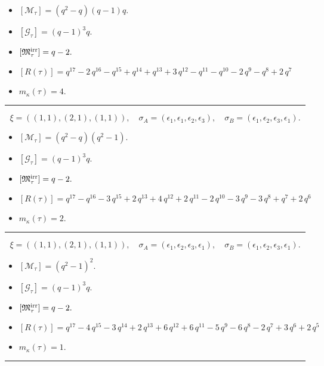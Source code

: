 \documentclass[10pt,a4paper]{amsart}
\begin{document}
\begin{itemize}
 \item $[\mathcal{M}_{\tau}] = {\left(q^{2} - q\right)} {\left(q - 1\right)} q .$

 \item $[\mathcal{G}_{\tau}] = {\left(q - 1\right)}^{3} q .$

 \item $[{\frak M}_{\tau}^{\textrm{irr}}] = q - 2 .$

 \item $[R(\tau)] = q^{17} - 2 \, q^{16} - q^{15} + q^{14} + q^{13} + 3 \, q^{12} - q^{11} - q^{10} - 2 \, q^{9} - q^{8} + 2 \, q^{7} $

 \item $m_{\kappa}(\tau) = 4 .$

 \end{itemize}
\noindent\rule{8cm}{0.4pt}

$$\xi = ({(1, 1)}, {(2, 1)}, {(1, 1)}),\quad \sigma_A = ({{\epsilon_1}}, {{\epsilon_1, \epsilon_2}}, {{\epsilon_3}}),\quad \sigma_B = ({{\epsilon_1}}, {{\epsilon_2, \epsilon_3}}, {{\epsilon_1}}).$$

\begin{itemize}
 \item $[\mathcal{M}_{\tau}] = {\left(q^{2} - q\right)} {\left(q^{2} - 1\right)} .$

 \item $[\mathcal{G}_{\tau}] = {\left(q - 1\right)}^{3} q .$

 \item $[{\frak M}_{\tau}^{\textrm{irr}}] = q - 2 .$

 \item $[R(\tau)] = q^{17} - q^{16} - 3 \, q^{15} + 2 \, q^{13} + 4 \, q^{12} + 2 \, q^{11} - 2 \, q^{10} - 3 \, q^{9} - 3 \, q^{8} + q^{7} + 2 \, q^{6} $

 \item $m_{\kappa}(\tau) = 2 .$

 \end{itemize}
\noindent\rule{8cm}{0.4pt}

$$\xi = ({(1, 1)}, {(2, 1)}, {(1, 1)}),\quad \sigma_A = ({{\epsilon_1}}, {{\epsilon_2, \epsilon_3}}, {{\epsilon_1}}),\quad \sigma_B = ({{\epsilon_1}}, {{\epsilon_2, \epsilon_3}}, {{\epsilon_1}}).$$

\begin{itemize}
 \item $[\mathcal{M}_{\tau}] = {\left(q^{2} - 1\right)}^{2} .$

 \item $[\mathcal{G}_{\tau}] = {\left(q - 1\right)}^{3} q .$

 \item $[{\frak M}_{\tau}^{\textrm{irr}}] = q - 2 .$

 \item $[R(\tau)] = q^{17} - 4 \, q^{15} - 3 \, q^{14} + 2 \, q^{13} + 6 \, q^{12} + 6 \, q^{11} - 5 \, q^{9} - 6 \, q^{8} - 2 \, q^{7} + 3 \, q^{6} + 2 \, q^{5} $

 \item $m_{\kappa}(\tau) = 1 .$

 \end{itemize}
\noindent\rule{8cm}{0.4pt}
\end{document}
